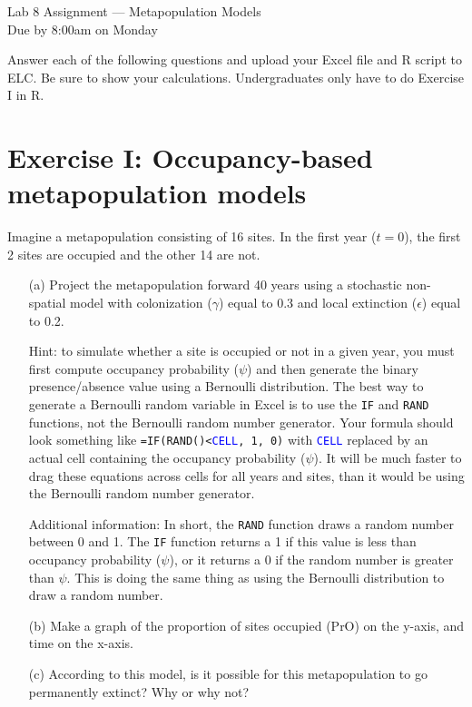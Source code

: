 \documentclass[12pt]{article}\usepackage[]{graphicx}\usepackage[]{xcolor}
\begin{document}
{
  \Large
  \centering
  Lab 8 Assignment --- Metapopulation Models \\
  Due by 8:00am on Monday \\
}

\vspace{6pt}

Answer each of the following questions and upload your Excel file and
R script to ELC. Be sure to show your calculations. Undergraduates
only have to do Exercise I in R. \\

\vspace{6pt}

\section*{Exercise I: Occupancy-based metapopulation models}


Imagine a metapopulation consisting of 16 sites. In the first year
($t=0$), the first 2 sites are occupied and the other 14 are not.
\begin{enumerate}
  \item[(a)] Project the metapopulation forward 40 years using a
    stochastic non-spatial model with colonization ($\gamma$) equal to
    0.3 and local extinction ($\epsilon$) equal to 0.2.

    Hint: to simulate whether a site is occupied or not in a given year,
    you must first compute occupancy probability ($\psi$) and then generate
    the binary presence/absence value using a Bernoulli distribution. The
    best way to generate a Bernoulli random variable in Excel is to use
    the \texttt{IF} and \texttt{RAND} functions, not the Bernoulli
    random number generator. Your formula should look something like
    \texttt{=IF(RAND()<\textcolor{blue}{CELL}, 1, 0)} with
    \texttt{\textcolor{blue}{CELL}} replaced by an  
    actual cell containing the occupancy probability
    ($\psi$). It will be much faster to drag these equations across
    cells for all years and sites, than it would be using the
    Bernoulli random number generator.

    Additional information: In short, the \texttt{RAND} function draws a
    random number between 0 and 1. The \texttt{IF} function returns a 1 if
    this value is less than occupancy probability ($\psi$), or it returns
    a 0 if the random number is greater than $\psi$. This is doing the
    same thing as using the Bernoulli distribution to draw a random
    number.
  \item[(b)] Make a graph of the proportion of sites occupied (PrO)
    on the y-axis, and time on the x-axis.
  \item[(c)] According to this model, is it possible for this
    metapopulation to go permanently extinct? Why or why not?
\end{enumerate}
\end{document}
